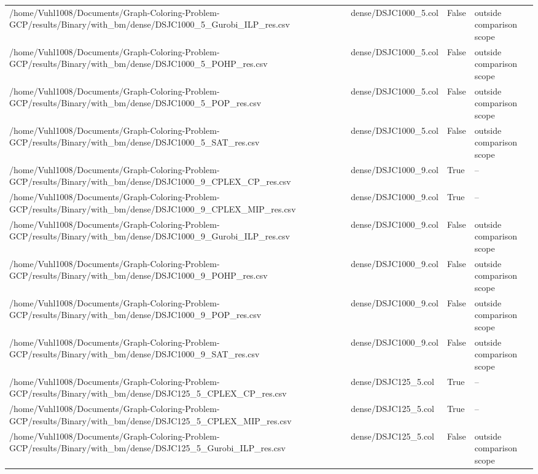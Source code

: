 \begin{table}[htbp]
\begin{tabular}{llll}
/home/Vuhl1008/Documents/Graph-Coloring-Problem-GCP/results/Binary/with\_bm/dense/DSJC1000\_5\_Gurobi\_ILP\_res.csv & dense/DSJC1000\_5.col & False & outside comparison scope \\
/home/Vuhl1008/Documents/Graph-Coloring-Problem-GCP/results/Binary/with\_bm/dense/DSJC1000\_5\_POHP\_res.csv & dense/DSJC1000\_5.col & False & outside comparison scope \\
/home/Vuhl1008/Documents/Graph-Coloring-Problem-GCP/results/Binary/with\_bm/dense/DSJC1000\_5\_POP\_res.csv & dense/DSJC1000\_5.col & False & outside comparison scope \\
/home/Vuhl1008/Documents/Graph-Coloring-Problem-GCP/results/Binary/with\_bm/dense/DSJC1000\_5\_SAT\_res.csv & dense/DSJC1000\_5.col & False & outside comparison scope \\
/home/Vuhl1008/Documents/Graph-Coloring-Problem-GCP/results/Binary/with\_bm/dense/DSJC1000\_9\_CPLEX\_CP\_res.csv & dense/DSJC1000\_9.col & True & -- \\
/home/Vuhl1008/Documents/Graph-Coloring-Problem-GCP/results/Binary/with\_bm/dense/DSJC1000\_9\_CPLEX\_MIP\_res.csv & dense/DSJC1000\_9.col & True & -- \\
/home/Vuhl1008/Documents/Graph-Coloring-Problem-GCP/results/Binary/with\_bm/dense/DSJC1000\_9\_Gurobi\_ILP\_res.csv & dense/DSJC1000\_9.col & False & outside comparison scope \\
/home/Vuhl1008/Documents/Graph-Coloring-Problem-GCP/results/Binary/with\_bm/dense/DSJC1000\_9\_POHP\_res.csv & dense/DSJC1000\_9.col & False & outside comparison scope \\
/home/Vuhl1008/Documents/Graph-Coloring-Problem-GCP/results/Binary/with\_bm/dense/DSJC1000\_9\_POP\_res.csv & dense/DSJC1000\_9.col & False & outside comparison scope \\
/home/Vuhl1008/Documents/Graph-Coloring-Problem-GCP/results/Binary/with\_bm/dense/DSJC1000\_9\_SAT\_res.csv & dense/DSJC1000\_9.col & False & outside comparison scope \\
/home/Vuhl1008/Documents/Graph-Coloring-Problem-GCP/results/Binary/with\_bm/dense/DSJC125\_5\_CPLEX\_CP\_res.csv & dense/DSJC125\_5.col & True & -- \\
/home/Vuhl1008/Documents/Graph-Coloring-Problem-GCP/results/Binary/with\_bm/dense/DSJC125\_5\_CPLEX\_MIP\_res.csv & dense/DSJC125\_5.col & True & -- \\
/home/Vuhl1008/Documents/Graph-Coloring-Problem-GCP/results/Binary/with\_bm/dense/DSJC125\_5\_Gurobi\_ILP\_res.csv & dense/DSJC125\_5.col & False & outside comparison scope \\

\end{tabular}
\end{table}
